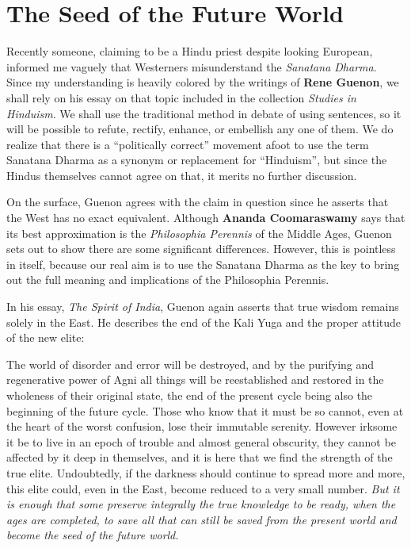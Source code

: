 \section{The Seed of the Future World}

Recently someone, claiming to be a Hindu priest despite looking European, informed me vaguely that Westerners misunderstand the \emph{Sanatana Dharma}. Since my understanding is heavily colored by the writings of \textbf{Rene Guenon}, we shall rely on his essay on that topic included in the collection \emph{Studies in Hinduism}. We shall use the traditional method in debate of using sentences, so it will be possible to refute, rectify, enhance, or embellish any one of them. We do realize that there is a ``politically correct'' movement afoot to use the term Sanatana Dharma as a synonym or replacement for ``Hinduism'', but since the Hindus themselves cannot agree on that, it merits no further discussion.

On the surface, Guenon agrees with the claim in question since he asserts that the West has no exact equivalent. Although \textbf{Ananda Coom\-aras\-wamy} says that its best approximation is the \emph{Philosophia Perennis} of the Middle Ages, Guenon sets out to show there are some significant differences. However, this is pointless in itself, because our real aim is to use the Sanatana Dharma as the key to bring out the full meaning and implications of the Philosophia Perennis.

In his essay, \emph{The Spirit of India}, Guenon again asserts that true wisdom remains solely in the East. He describes the end of the Kali Yuga and the proper attitude of the new elite:

\begin{quotex}
The world of disorder and error will be destroyed, and by the purifying and regenerative power of Agni all things will be reestablished and restored in the wholeness of their original state, the end of the present cycle being also the beginning of the future cycle. Those who know that it must be so cannot, even at the heart of the worst confusion, lose their immutable serenity. However irksome it be to live in an epoch of trouble and almost general obscurity, they cannot be affected by it deep in themselves, and it is here that we find the strength of the true elite. Undoubtedly, if the darkness should continue to spread more and more, this elite could, even in the East, become reduced to a very small number. \emph{But it is enough that some preserve integrally the true knowledge to be ready, when the ages are completed, to save all that can still be saved from the present world and become the seed of the future world.}
\end{quotex}


